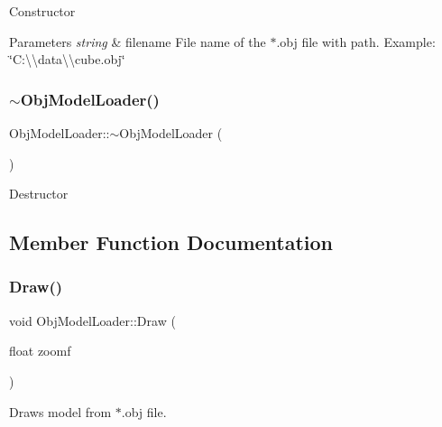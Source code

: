 Constructor 
\begin{DoxyParams}{Parameters}
{\em string} & filename File name of the $\ast$.obj file with path. Example\+: \char`\"{}\+C\+:\textbackslash{}\textbackslash{}data\textbackslash{}\textbackslash{}cube.\+obj\char`\"{} \\
\hline
\end{DoxyParams}
\mbox{\label{class_obj_model_loader_a203757d2c67c25889be3d61f140bc365}} 
\subsubsection{\texorpdfstring{$\sim$\+Obj\+Model\+Loader()}{~ObjModelLoader()}\hspace{0.1cm}{\footnotesize\ttfamily [3/3]}}
{\footnotesize\ttfamily Obj\+Model\+Loader\+::$\sim$\+Obj\+Model\+Loader (\begin{DoxyParamCaption}{ }\end{DoxyParamCaption})}

Destructor 

\subsection{Member Function Documentation}
\mbox{\label{class_obj_model_loader_ae71538b366c781ec45f7ebe4fec84ed7}} 
\subsubsection{\texorpdfstring{Draw()}{Draw()}\hspace{0.1cm}{\footnotesize\ttfamily [1/3]}}
{\footnotesize\ttfamily void Obj\+Model\+Loader\+::\+Draw (\begin{DoxyParamCaption}\item[{float}]{zoomf }\end{DoxyParamCaption})}

Draws model from $\ast$.obj file. \mbox{\label{class_obj_model_loader_a65fe8c583425b7c77577ababd9073d37}} 
